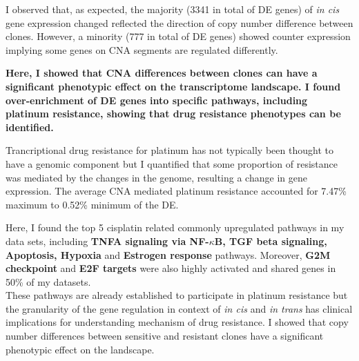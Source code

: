 I observed that, as expected, the majority (3341 in total of DE genes) of \textit{in cis} gene expression changed reflected the direction of copy number difference between clones. However, a minority (777 in total of DE genes) showed counter expression implying some genes on CNA segments are regulated differently. 

\textbf{Here, I showed that CNA differences between clones can have a significant phenotypic effect on the transcriptome landscape.
I found over-enrichment of DE genes into specific pathways, including platinum resistance, showing that drug resistance phenotypes can be identified. } 


 
Trancriptional drug resistance for platinum has not typically been thought to have a genomic component but I quantified that some proportion of resistance was mediated by the changes in the genome, resulting a change in gene expression. The average CNA mediated platinum resistance accounted for 7.47\% maximum to 0.52\% minimum of the DE. 


Here, I found the top 5 cisplatin related commonly upregulated pathways in my data sets, including \textbf{TNFA signaling via NF-$\kappa$B, TGF  beta  signaling, Apoptosis, Hypoxia} and \textbf{Estrogen response} pathways. Moreover, \textbf{G2M checkpoint} and \textbf{E2F targets} were also highly activated and shared genes in 50\% of my datasets. 
\\
These pathways are already established to participate in platinum resistance but the granularity of the gene regulation in context of \textit{in cis} and \textit{in trans} has clinical implications for understanding mechanism of drug resistance. I showed that copy number differences between sensitive and resistant clones have a significant phenotypic effect on the landscape. 

